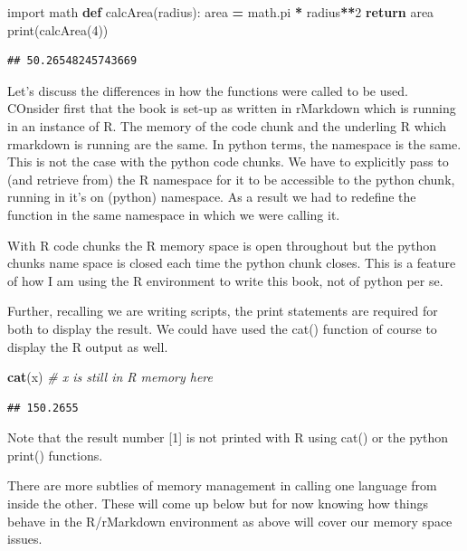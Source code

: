 \documentclass[]{book}
\newenvironment{Shaded}{\begin{snugshade}}{\end{snugshade}}
\newcommand{\KeywordTok}[1]{\textcolor[rgb]{0.13,0.29,0.53}{\textbf{#1}}}
\newcommand{\DecValTok}[1]{\textcolor[rgb]{0.00,0.00,0.81}{#1}}
\newcommand{\ImportTok}[1]{#1}
\newcommand{\CommentTok}[1]{\textcolor[rgb]{0.56,0.35,0.01}{\textit{#1}}}
\newcommand{\ControlFlowTok}[1]{\textcolor[rgb]{0.13,0.29,0.53}{\textbf{#1}}}
\newcommand{\OperatorTok}[1]{\textcolor[rgb]{0.81,0.36,0.00}{\textbf{#1}}}
\newcommand{\BuiltInTok}[1]{#1}
\newcommand{\NormalTok}[1]{#1}
\theoremstyle{definition}
\theoremstyle{definition}
\theoremstyle{definition}
\theoremstyle{remark}
\begin{document}
\begin{Shaded}
\begin{Highlighting}[]
\ImportTok{import}\NormalTok{ math}
\KeywordTok{def}\NormalTok{ calcArea(radius):}
\NormalTok{  area }\OperatorTok{=}\NormalTok{ math.pi }\OperatorTok{*}\NormalTok{ radius}\OperatorTok{**}\DecValTok{2}
  \ControlFlowTok{return}\NormalTok{ area}
\BuiltInTok{print}\NormalTok{(calcArea(}\DecValTok{4}\NormalTok{))}
\end{Highlighting}
\end{Shaded}

\begin{verbatim}
## 50.26548245743669
\end{verbatim}

Let's discuss the differences in how the functions were called to be
used. COnsider first that the book is set-up as written in rMarkdown
which is running in an instance of R. The memory of the code chunk and
the underling R which rmarkdown is running are the same. In python
terms, the namespace is the same. This is not the case with the python
code chunks. We have to explicitly pass to (and retrieve from) the R
namespace  for it to be accessible to the python chunk,
running in it's on (python) namespace. As a result we had to redefine
the function in the same namespace in which we were calling it.

With R code chunks the R memory space is open throughout but the python
chunks name space is closed each time the python chunk closes. This is a
feature of how I am using the R environment to write this book, not of
python per se.

Further, recalling we are writing scripts, the print statements are
required for both to display the result. We could have used the cat()
function of course to display the R output as well.

\begin{Shaded}
\begin{Highlighting}[]
\KeywordTok{cat}\NormalTok{(x)       }\CommentTok{# x is still in R memory here}
\end{Highlighting}
\end{Shaded}

\begin{verbatim}
## 150.2655
\end{verbatim}

Note that the result number {[}1{]} is not printed with R using cat() or
the python print() functions.

There are more subtlies of memory management in calling one language
from inside the other. These will come up below but for now knowing how
things behave in the R/rMarkdown environment as above will cover our
memory space issues.
\end{document}
